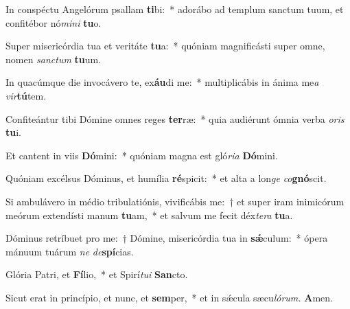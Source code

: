 \item In conspéctu Angelórum psallam \textbf{ti}bi:~* adorábo ad templum sanctum tuum, et confitébor nó\textit{mini} \textbf{tu}o.
\item Super misericórdia tua et veritáte \textbf{tu}a:~* quóniam magnificásti super omne, nomen \textit{sanctum} \textbf{tu}um.
\item In quacúmque die invocávero te, ex\textbf{áu}di me:~* multiplicábis in ánima me\tinyhspace\textit{a} \textit{vir}\textbf{tú}tem.
\item Confiteántur tibi Dómine omnes reges \textbf{ter}ræ:~* quia audiérunt ómnia verba \textit{oris} \textbf{tu}i.
\item Et cantent in viis \textbf{Dó}mini:~* quóniam magna est gló\textit{ria} \textbf{Dó}mini.
\item Quóniam excélsus Dóminus, et humília \textbf{ré}spicit:~* et alta a lon\textit{ge} \textit{co}\textbf{gnó}scit.
\item Si ambulávero in médio tribulatiónis, vivificábis me:~† et super iram inimicórum meórum extendísti manum \textbf{tu}am,~* et salvum me fecit déx\teenyhspace\textit{tera} \textbf{tu}a.
\item Dóminus retríbuet pro me:~† Dómine, misericórdia tua in \textbf{sǽ}culum:~* ópera mánuum tuárum \textit{ne} \textit{de}\textbf{spí}cias.
\item Glória Patri, et \textbf{Fí}lio,~* et Spirí\tinyhspace\textit{tui} \textbf{San}cto.
\item Sicut erat in princípio, et nunc, et \textbf{sem}per,~* et in sǽcula sæcu\tinyhspace\textit{lórum.} \textbf{A}men.
